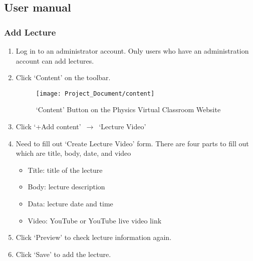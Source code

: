 \documentclass[10pt]{article}
\begin{document}
    \subsection{User manual}
        \subsubsection{Add Lecture}
            \begin{enumerate}
            	\item Log in to an administrator account. Only users who have an administration account can add lectures.
            	\item Click `Content' on the toolbar.
            	   \begin{figure}[!ht]
            	        \centering
                        \texttt{[image: Project\_Document/content]}
                        \caption{`Content' Button on the Physics Virtual Classroom Website}
                    \end{figure}
            	\item Click `+Add content' $\,\to\,$ `Lecture Video'
            	\item Need to fill out `Create Lecture Video' form. There are four parts to fill out which are title, body, date, and video 
            	    \begin{itemize}
                    	\item Title: title of the lecture
                    	\item Body: lecture description
                    	\item Data: lecture date and time
                    	\item Video: YouTube or YouTube live video link
                    \end{itemize} 
            	\item Click `Preview' to check lecture information again.
            	\item Click `Save' to add the lecture.
            \end{enumerate}
            
\end{document}
